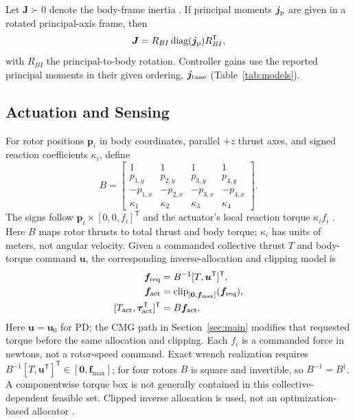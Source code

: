 \documentclass[letterpaper, 10 pt, conference]{ieeeconf}
\newcommand{\T}{^{\mathsf T}}
\newcommand{\clip}{\operatorname{clip}}
\begin{document}
Let $\bm J\succ0$ denote the body-frame inertia \cite{schaub2018amss}. If principal moments $\bm j_{\rm p}$ are given in a rotated principal-axis frame, then
\begin{equation}
 \bm J=R_{BI}\operatorname{diag}(\bm j_{\rm p})R_{BI}\T,
 \label{eq:inertiaframe}
\end{equation}
with $R_{BI}$ the principal-to-body rotation. Controller gains use the reported principal moments in their given ordering, $\bm j_{\rm tune}$ (Table~\ref{tab:models}).

\subsection{Actuation and Sensing}
%
For rotor positions $\bm p_i$ in body coordinates, parallel $+z$ thrust
axes, and signed reaction coefficients $\kappa_i$, define
\begin{equation}
 B=\begin{bmatrix}
 1&1&1&1\\p_{1,y}&p_{2,y}&p_{3,y}&p_{4,y}\\
 -p_{1,x}&-p_{2,x}&-p_{3,x}&-p_{4,x}\\
 \kappa_1&\kappa_2&\kappa_3&\kappa_4
 \end{bmatrix}.
 \label{eq:allocationmatrix}
\end{equation}
The signs follow $\bm p_i\times[0,0,f_i]\T$ and the actuator's local reaction torque $\kappa_i f_i$ \cite{garciacarrillo2013quad}. Here $B$ maps rotor thrusts to total thrust and body torque; $\kappa_i$ has units of meters, not angular velocity. Given a commanded collective thrust $T$ and body-torque command $\bm u$, the corresponding inverse-allocation and clipping model is
\begin{equation}
 \begin{aligned}
 \bm f_{\rm req}&=B^{-1}[T,\bm u\T]\T,\\
 \bm f_{\rm act}&=\clip_{[\bm0,\bm f_{\max}]}(\bm f_{\rm req}),\\
 [T_{\rm act},\bm\tau_{\rm act}\T]\T&=B\bm f_{\rm act}.
 \end{aligned}
 \label{eq:mixer}
\end{equation}
Here $\bm u=\bm u_0$ for PD; the CMG path in Section~\ref{sec:main}
modifies that requested torque before the same allocation and clipping.
Each $f_i$ is a commanded force in newtons, not a rotor-speed command.
Exact wrench realization requires $B^{-1}[T,\bm u\T]\T\in[\bm0,\bm f_{\max}]$; for four
rotors $B$ is square and invertible, so $B^{-1}=B^{\dagger}$.
A componentwise torque box is not generally contained in this
collective-dependent feasible set. Clipped inverse allocation is used,
not an optimization-based allocator \cite{monteiro2016allocation}.
\end{document}
